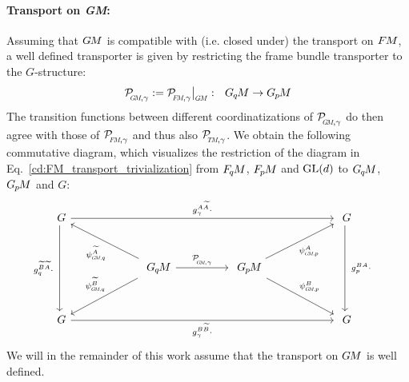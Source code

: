 \paragraph{Transport on \textit{GM}:}
Assuming that $G\mkern-1.4muM$ is compatible with (i.e. closed under) the transport on $F\mkern-1.5muM$, a well defined transporter is given by restricting the frame bundle transporter to the $G$-structure:
\begin{align}\label{eq:transporter_GM_def}
  \PGMgamma := \PFMgamma \big|_{\scalebox{.62}{$\GM$}}:\ \ \GqM \to \GpM
\end{align}
The transition functions between different coordinatizations of $\PGMgamma$ do then agree with those of $\PFMgamma$ and thus also $\PTMgamma$.
We obtain the following commutative diagram, which visualizes the restriction of the diagram in Eq.~\eqref{cd:FM_transport_trivialization} from $F_{\mkern-1.5mu q}\mkern-1.1muM$, $F_{\mkern-1.5mu p}\mkern-1.0muM$ and $\operatorname{GL}(d)$ to $G_{\mkern-1.3mu q}\mkern-1.3muM$, $G_{\mkern-1.3mu p}\mkern-1.2muM$ and $G$:
\begin{equation}\label{cd:transport_GM_triv}
\begin{tikzcd}[column sep=60pt, row sep=30, font=\normalsize]
    G
        \arrow[dd, "g_q^{\widetilde{B}\widetilde{A}}\cdot\ "']
        \arrow[rrr, "g_\gamma^{A\widetilde{A}}\cdot"]
    & &[-3ex] &
    G
        \arrow[dd, "\ g_p^{BA}\cdot"]
    \\
    &
    \GqM
        \arrow[ul, "\psiGMq^{\widetilde{A}}", pos=.45]
        \arrow[dl, "\psiGMq^{\widetilde{B}}"', pos=.45]
        \arrow[r, "\PGMgamma"]
    &
    \GpM
        \arrow[ur, "\psiGMp^A"', pos=.45]
        \arrow[dr, "\psiGMp^B", pos=.45]
    \\
    G
        \arrow[rrr, "g_\gamma^{B\widetilde{B}}\cdot"']
    & & &
    G
\end{tikzcd}
\quad
\end{equation}
We will in the remainder of this work assume that the transport on $G\mkern-1.4muM$ is well defined.





